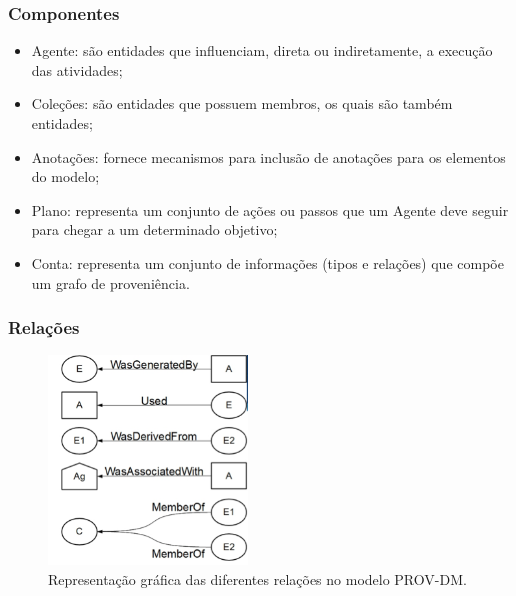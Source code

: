 \documentclass{beamer}
\begin{document}
\begin{frame}
\frametitle{Componentes}
\begin{itemize}
\item Agente: s\~ao entidades que influenciam,
  direta ou indiretamente, a execu\c{c}\~ao das atividades;
\item Cole\c{c}\~oes: s\~ao entidades que possuem membros, os quais
  s\~ao tamb\'em entidades;
\item Anota\c{c}\~oes: fornece mecanismos para inclus\~ao de
  anota\c{c}\~oes para os elementos do modelo;
\item Plano: representa um conjunto de a\c{c}\~oes ou passos que um Agente
  deve seguir para chegar a um determinado objetivo;
\item Conta: representa um conjunto de informa\c{c}\~oes (tipos e
  rela\c{c}\~oes) que comp\~oe um grafo de proveni\^encia.
\end{itemize}
\end{frame}

\begin{frame}
\frametitle{Rela\c{c}\~oes}
\begin{figure}
\centering
\includegraphics[width=150pt]{images/relacoesprovdm.png}
\caption{Representa\c{c}\~ao gr\'afica das diferentes rela\c{c}\~oes no modelo
  PROV-DM. \cite{p5}}
\label{fig:entidadeprovdm}
\end{figure}
\end{frame}

\end{document}

